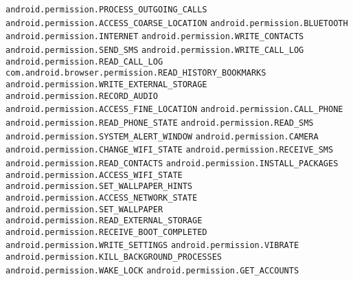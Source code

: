 \texttt{android.permission.PROCESS\_OUTGOING\_CALLS}
\newline \texttt{android.permission.ACCESS\_COARSE\_LOCATION}
\newline \texttt{android.permission.BLUETOOTH}
\newline \texttt{android.permission.INTERNET}
\newline \texttt{android.permission.WRITE\_CONTACTS}
\newline \texttt{android.permission.SEND\_SMS}
\newline \texttt{android.permission.WRITE\_CALL\_LOG}
\newline \texttt{android.permission.READ\_CALL\_LOG}
\newline \texttt{com.android.browser.permission.READ\_HISTORY\_BOOKMARKS}
\newline \texttt{android.permission.WRITE\_EXTERNAL\_STORAGE}
\newline \texttt{android.permission.RECORD\_AUDIO}
\newline \texttt{android.permission.ACCESS\_FINE\_LOCATION}
\newline \texttt{android.permission.CALL\_PHONE}
\newline \texttt{android.permission.READ\_PHONE\_STATE}
\newline \texttt{android.permission.READ\_SMS}
\newline \texttt{android.permission.SYSTEM\_ALERT\_WINDOW}
\newline \texttt{android.permission.CAMERA}
\newline \texttt{android.permission.CHANGE\_WIFI\_STATE}
\newline \texttt{android.permission.RECEIVE\_SMS}
\newline \texttt{android.permission.READ\_CONTACTS}
\newline \texttt{android.permission.INSTALL\_PACKAGES}
\newline \texttt{android.permission.ACCESS\_WIFI\_STATE}
\newline \texttt{android.permission.SET\_WALLPAPER\_HINTS}
\newline \texttt{android.permission.ACCESS\_NETWORK\_STATE}
\newline \texttt{android.permission.SET\_WALLPAPER}
\newline \texttt{android.permission.READ\_EXTERNAL\_STORAGE}
\newline \texttt{android.permission.RECEIVE\_BOOT\_COMPLETED}
\newline \texttt{android.permission.WRITE\_SETTINGS}
\newline \texttt{android.permission.VIBRATE}
\newline \texttt{android.permission.KILL\_BACKGROUND\_PROCESSES}
\newline \texttt{android.permission.WAKE\_LOCK}
\newline \texttt{android.permission.GET\_ACCOUNTS}


